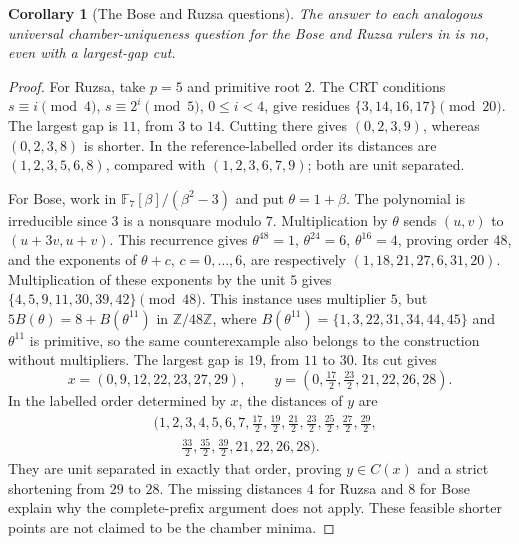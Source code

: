\documentclass[11pt,a4paper]{article}
\newtheorem{corollary}[theorem]{Corollary}
\newcommand{\Z}{\mathbb Z}
\begin{document}
\begin{corollary}[The Bose and Ruzsa questions]\label{cor:other}
The answer to each analogous universal chamber-uniqueness question
for the Bose and Ruzsa rulers in \cite[Section~10, p.~8]{notik} is no,
even with a largest-gap cut.
\end{corollary}
\begin{proof}
For Ruzsa, take $p=5$ and primitive root $2$. The CRT conditions
$s\equiv i\pmod4$, $s\equiv2^i\pmod5$, $0\le i<4$,
give residues $\{3,14,16,17\}\pmod{20}$. The largest gap is $11$,
from $3$ to $14$. Cutting there gives $(0,2,3,9)$, whereas
$(0,2,3,8)$ is shorter. In the reference-labelled order its distances
are $(1,2,3,5,6,8)$, compared with $(1,2,3,6,7,9)$;
both are unit separated.

For Bose, work in $\mathbb F_7[\beta]/(\beta^2-3)$ and put
$\theta=1+\beta$. The polynomial is irreducible since $3$ is a
nonsquare modulo $7$. Multiplication by $\theta$ sends $(u,v)$ to
$(u+3v,u+v)$. This recurrence gives
$\theta^{48}=1$, $\theta^{24}=6$, $\theta^{16}=4$, proving order $48$,
and the exponents of $\theta+c$, $c=0,\ldots,6$, are respectively
$(1,18,21,27,6,31,20)$. Multiplication of these exponents by the unit
$5$ gives $\{4,5,9,11,30,39,42\}\pmod{48}$.
This instance uses multiplier $5$, but
$5B(\theta)=8+B(\theta^{11})$ in $\Z/48\Z$, where
$B(\theta^{11})=\{1,3,22,31,34,44,45\}$ and $\theta^{11}$ is
primitive, so the same counterexample also belongs to the construction
without multipliers.
The largest gap is $19$, from $11$ to $30$. Its cut gives
\[
 x=(0,9,12,22,23,27,29),\qquad
 y=(0,\tfrac{17}2,\tfrac{23}2,21,22,26,28).
\]
In the labelled order determined by $x$, the distances of $y$ are
\[
\begin{split}
 &(1,2,3,4,5,6,7,\tfrac{17}2,\tfrac{19}2,\tfrac{21}2,
 \tfrac{23}2,\tfrac{25}2,\tfrac{27}2,\tfrac{29}2,\\
 &\hspace{2em}\tfrac{33}2,\tfrac{35}2,\tfrac{39}2,21,22,26,28).
\end{split}
\]
They are unit separated in exactly that order, proving $y\in C(x)$
and a strict shortening from $29$ to $28$.
The missing distances $4$ for Ruzsa and $8$ for Bose explain why
the complete-prefix argument does not apply. These feasible shorter
points are not claimed to be the chamber minima.
\end{proof}
\end{document}
